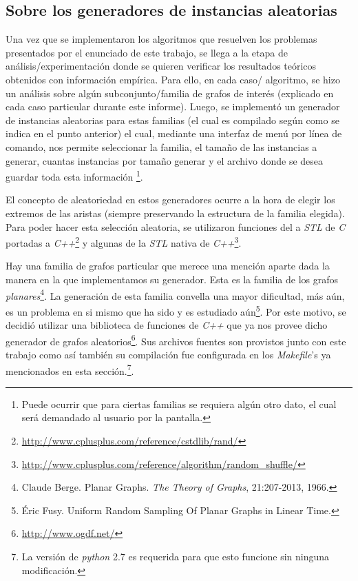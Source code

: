 {}
\subsection*{Sobre los generadores de instancias aleatorias}
\par Una vez que se implementaron los algoritmos que resuelven los problemas
    presentados por el enunciado de este trabajo, se llega a la etapa de
    an\'alisis/experimentaci\'on donde se quieren verificar los resultados
    te\'oricos obtenidos con informaci\'on emp\'irica. Para ello, en cada caso/%
    algoritmo, se hizo un an\'alisis sobre alg\'un subconjunto/familia de grafos
    de inter\'es (explicado en cada caso particular durante este informe). Luego,
    se implement\'o un generador de instancias aleatorias para estas familias
    (el cual es compilado seg\'un como se indica en el punto anterior) el cual,
    mediante una interfaz de men\'u por l\'inea de comando, nos permite seleccionar
    la familia, el tama\~no de las instancias a generar, cuantas instancias por
    tama\~no generar y el archivo donde se desea guardar toda esta informaci\'on%
    \footnote{Puede ocurrir que para ciertas familias se requiera alg\'un otro dato,
    el cual ser\'a demandado al usuario por la pantalla.}.

\par El concepto de aleatoriedad en estos generadores ocurre a la hora de elegir
    los extremos de las aristas (siempre preservando la estructura de la familia
    elegida). Para poder hacer esta selecci\'on aleatoria, se utilizaron funciones
    del a \emph{STL} de \emph{C} portadas a \emph{C++}\footnote{%
    \url{http://www.cplusplus.com/reference/cstdlib/rand/}} y algunas de la
    \emph{STL} nativa de \emph{C++}\footnote{%
    \url{http://www.cplusplus.com/reference/algorithm/random_shuffle/}}.

\par Hay una familia de grafos particular que merece una menci\'on aparte dada
    la manera en la que implementamos su generador. Esta es la familia de los
    grafos \emph{planares}\footnote{Claude Berge. Planar Graphs. \emph{The Theory
    of Graphs}, 21:207-2013, 1966.}. La generaci\'on de esta familia convella
    una mayor dificultad, m\'as a\'un, es un problema en si mismo que ha sido
    y es estudiado a\'un\footnote{\'Eric Fusy. Uniform Random Sampling Of Planar
    Graphs in Linear Time.}. Por este motivo, se decidi\'o utilizar una
    biblioteca de funciones de \emph{C++} que ya nos provee dicho generador
    de grafos aleatorios\footnote{\url{http://www.ogdf.net/}}. Sus archivos
    fuentes son provistos junto con este trabajo como as\'i tambi\'en su
    compilaci\'on fue configurada en los \emph{Makefile}'s ya mencionados en
    esta secci\'on.\footnote{La versi\'on de \emph{python} 2.7 es requerida para
    que esto funcione sin ninguna modificaci\'on.}.

